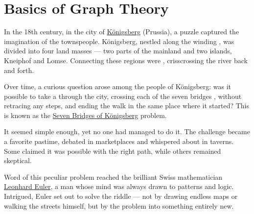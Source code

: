 \documentclass[a4paper, 12pt]{report}
\institute{\curlyquotes{\hspace{0.25mm}Sapienza} Università di Roma}
\subtitle{Appunti integrati con il libro \book}
\author{\textit{Autore}\\\authorName}
\institute{\curlyquotes{\hspace{0.25mm}Sapienza} University of Rome}
\subtitle{Lecture notes integrated with the book \book}
\author{\textit{Author}\\\authorName}
\title{\courseName}
\date{\today}
\begin{document}
    \maketitle

    {
        \hypersetup{allcolors=black}

        \romantableofcontents
    }

    \introduction


    \chapter{Basics of Graph Theory}

    In the 18th century, in the city of \href{https://en.wikipedia.org/wiki/K%C3%B6nigsberg}{Königsberg} (Prussia), a puzzle captured the imagination of the townspeople. Königsberg, nestled along the winding \tit{Pregel River}, was divided into four land masses --- two parts of the mainland and two islands, Kneiphof and Lomse. Connecting these regions were \tbf{seven bridges}, crisscrossing the river back and forth.

    Over time, a curious question arose among the people of Königsberg: was it possible to take a  through the city, crossing each of the seven bridges , without retracing any steps, and ending the walk in the same place where it started? This is known as the \href{https://en.wikipedia.org/wiki/Seven_Bridges_of_K%C3%B6nigsberg}{Seven Bridges of Königsberg} problem.

        It seemed simple enough, yet no one had managed to do it. The challenge became a favorite pastime, debated in marketplaces and whispered about in taverns. Some claimed it was possible with the right path, while others remained skeptical.


    Word of this peculiar problem reached the brilliant Swiss mathematician \href{/}{Leonhard Euler}, a man whose mind was always drawn to patterns and logic. Intrigued, Euler set out to solve the riddle --- not by drawing endless maps or walking the streets himself, but by  the problem into something entirely new.
\end{document}
